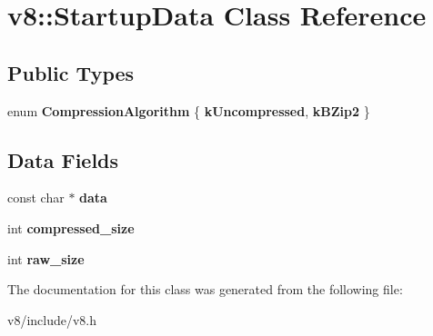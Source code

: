 \hypertarget{classv8_1_1StartupData}{}\section{v8\+:\+:Startup\+Data Class Reference}
\label{classv8_1_1StartupData}
\subsection*{Public Types}
\begin{DoxyCompactItemize}
\item 
\hypertarget{classv8_1_1StartupData_ab23e8d8db2bbc803cf6db68e258d64f0}{}enum {\bfseries Compression\+Algorithm} \{ {\bfseries k\+Uncompressed}, 
{\bfseries k\+B\+Zip2}
 \}\label{classv8_1_1StartupData_ab23e8d8db2bbc803cf6db68e258d64f0}

\end{DoxyCompactItemize}
\subsection*{Data Fields}
\begin{DoxyCompactItemize}
\item 
\hypertarget{classv8_1_1StartupData_a8daf0c5282d7c465988757dc4ecda1af}{}const char $\ast$ {\bfseries data}\label{classv8_1_1StartupData_a8daf0c5282d7c465988757dc4ecda1af}

\item 
\hypertarget{classv8_1_1StartupData_a8037d1138d46d3977384c0e056ea5920}{}int {\bfseries compressed\+\_\+size}\label{classv8_1_1StartupData_a8037d1138d46d3977384c0e056ea5920}

\item 
\hypertarget{classv8_1_1StartupData_a2f797e167b2bebd18ddca83dedda6ffa}{}int {\bfseries raw\+\_\+size}\label{classv8_1_1StartupData_a2f797e167b2bebd18ddca83dedda6ffa}

\end{DoxyCompactItemize}


The documentation for this class was generated from the following file\+:\begin{DoxyCompactItemize}
\item 
v8/include/v8.\+h\end{DoxyCompactItemize}

